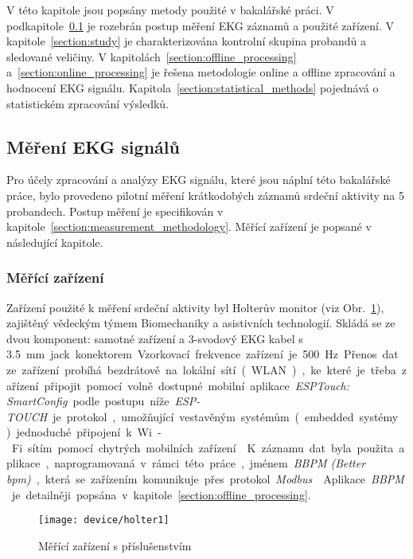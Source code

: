 V této kapitole jsou popsány metody použité v bakalářské práci. V
podkapitole~\ref{section:measurement} je rozebrán postup měření EKG záznamů a
použité zařízení. V kapitole~\ref{section:study} je charakterizována kontrolní
skupina probandů a sledované veličiny. V
kapitolách~\ref{section:offline_processing} a~\ref{section:online_processing} je
řešena metodologie online a offline zpracování a hodnocení EKG signálu.
Kapitola~\ref{section:statistical_methods} pojednává o statistickém zpracování
výsledků.

\subsection{Měření EKG signálů}
\label{section:measurement}
Pro účely zpracování a analýzy EKG signálu, které jsou náplní této bakalářské
práce, bylo provedeno pilotní měření krátkodobých záznamů srdeční aktivity na 5
probandech. Postup měření je specifikován v
kapitole~\ref{section:measurement_methodology}. Měřící zařízení je popsané v
následující kapitole.

\subsubsection{Měřící zařízení}
\label{section:measurement_device}
Zařízení použité k měření srdeční aktivity byl Holterův monitor (viz
Obr.~\ref{fig:device}), zajištěný vědeckým týmem Biomechaniky a asistivních
technologií. Skládá se ze dvou komponent: samotné zařízení a 3-svodový EKG kabel
s 3.5~\si\mm~jack konektorem. Vzorkovací frekvence zařízení je 500~\si\Hz.

Přenos dat ze zařízení probíhá bezdrátově na lokální sítí (WLAN), ke které je
třeba zařízení připojit pomocí volně dostupné mobilní aplikace \textit{ESPTouch:
    SmartConfig} podle postupu níže. \textit{ESP-TOUCH} je protokol, umožňující
vestavěným systémům (embedded systémy) jednoduché připojení k Wi-Fi sítím pomocí
chytrých mobilních zařízení~\cite{esptouch}. K záznamu dat byla použita
aplikace, naprogramovaná v rámci této práce, jménem \textit{BBPM (Better bpm)},
která se zařízením komunikuje přes protokol \textit{Modbus}~\cite{modbus}.
Aplikace \textit{BBPM} je detailněji popsána v
kapitole~\ref{section:offline_processing}.

\begin{figure}[H]
    \begin{center}
        \texttt{[image: device/holter1]}
        \caption{Měřící zařízení s příslušenstvím}
        \label{fig:device}
    \end{center}
\end{figure}

